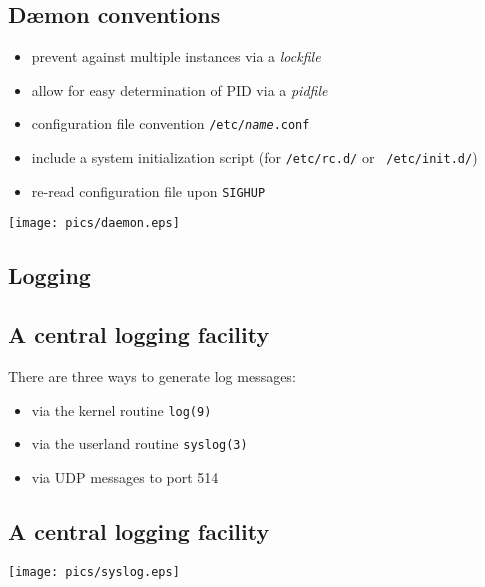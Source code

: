 \documentclass[xga]{xdvislides}
\begin{document}
\subsection{D\ae mon conventions}
\begin{itemize}
	\item prevent against multiple instances via a {\em lockfile}
	\item allow for easy determination of PID via a {\em pidfile}
	\item configuration file convention {\tt /etc/{\em name}.conf}
	\item include a system initialization script (for {\tt /etc/rc.d/} or {\tt
		/etc/init.d/})
	\item re-read configuration file upon {\tt SIGHUP}
\end{itemize}

\vfill
\hfill\texttt{[image: pics/daemon.eps]} \\


\subsection{Logging}

\subsection{A central logging facility}

There are three ways to generate log messages:
\begin{itemize}
	\item via the kernel routine {\tt log(9)}
	\item via the userland routine {\tt syslog(3)}
	\item via UDP messages to port 514
\end{itemize}

\subsection{A central logging facility}
\begin{center}
	\texttt{[image: pics/syslog.eps]}
\end{center}
\end{document}
